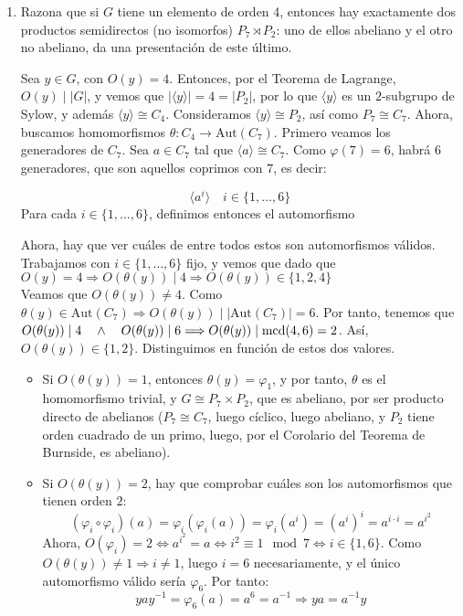 \documentclass[12pt]{article}
\newcommand{\Aut}{\text{Aut}}
\begin{document}
\begin{ejercicio}
\begin{enumerate}[label=(\alph*)]
            \item Razona que si $G$ tiene un elemento de orden 4, entonces hay exactamente dos productos semidirectos (no isomorfos) $P_7 \rtimes P_2$: uno de ellos abeliano y el otro no abeliano, da una presentación de este último.
            
            Sea $y \in G$, con $O(y) = 4$. Entonces, por el Teorema de Lagrange, $O(y) \mid |G|$, y vemos que $|\langle y \rangle| = 4 = |P_2|$, por lo que $ \langle y \rangle$ es un $2$-subgrupo de Sylow, y además $ \langle y \rangle \cong C_4$.
            Consideramos $\langle y \rangle \cong P_2$, así como $P_7 \cong C_7$. Ahora, buscamos homomorfismos $\theta : C_4 \to \Aut(C_7)$. Primero veamos los generadores de $C_7$. Sea $a \in C_7$ tal que $\langle a \rangle \cong C_7$. Como $\varphi(7) = 6$, habrá 6 generadores, que son aquellos
            coprimos con $7$, es decir:

            $$\langle a^{i} \rangle \quad i \in \{1, \ldots, 6\}$$ Para cada $i \in \{1, \ldots, 6\}$, definimos entonces el automorfismo 

            Ahora, hay que ver cuáles de entre todos estos son automorfismos válidos. Trabajamos con $i \in \{1, \ldots, 6\}$ fijo, y vemos que dado que $O(y) = 4 \Longrightarrow O(\theta(y)) \mid 4 \Longrightarrow O(\theta(y)) \in \{1, 2, 4\}$ \\

            Veamos que $O(\theta(y)) \neq 4$. Como $\theta(y) \in \Aut(C_7) \Longrightarrow O(\theta(y)) \mid |\Aut(C_7)| = 6$. Por tanto, tenemos que $O(\theta(y)) \mid 4 \quad \land \quad O(\theta(y)) \mid 6 \Longrightarrow O(\theta(y)) \mid \operatorname{mcd}(4,6) = 2$. Así, $O(\theta(y)) \in \{1,2\}$. Distinguimos
            en función de estos dos valores.

            \begin{itemize}
                \item Si $O(\theta(y)) = 1$, entonces $\theta(y) = \varphi_1$, y por tanto, $\theta$ es el homomorfismo trivial, y $G \cong P_7 \times P_2$, que es abeliano, por ser producto directo de abelianos ($P_7 \cong C_7$, luego cíclico, luego abeliano, y $P_2$ tiene orden cuadrado de un primo,
                luego, por el Corolario del Teorema de Burnside, es abeliano).
                \item Si $O(\theta(y)) = 2$, hay que comprobar cuáles son los automorfismos que tienen orden $2$:
                $$(\varphi_i \circ \varphi_i)(a) = \varphi_i(\varphi_i(a)) = \varphi_i(a^i) = (a^i)^i = a^{i \cdot i} = a^{i^2}$$
                Ahora, $O(\varphi_i) = 2 \iff a^{i^2} = a \iff i^2 \equiv 1 \mod 7 \iff i \in \{1,6\}$. Como $O(\theta(y)) \neq 1 \Longrightarrow i \neq 1$, luego $i=6$ necesariamente, y el único automorfismo válido sería $\varphi_6$. Por tanto:
                $$yay^{-1} = \varphi_6(a) = a^6 = a^{-1} \Longrightarrow ya = a^{-1}y$$
                

\end{itemize}
\end{enumerate}
\end{ejercicio}
\end{document}
